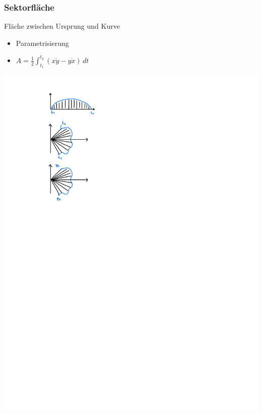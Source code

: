     \subsubsection{Sektorfläche}
        \flushleft Fläche zwischen Ursprung und Kurve
        \begin{minipage}{0.99\linewidth}
            \begin{minipage}{0.65\linewidth}
                \begin{itemize}
                    \item Parametrisierung
                    \item[]  $\displaystyle A= \frac{1}{2} \int_{t_1}^{t_2} (x \dot{y} - y \dot{x}) \, dt$   
                    \end{itemize}
            \end{minipage}
            \begin{minipage}{0.34\linewidth}
                    \includegraphics[width=0.6\linewidth]{src/11_Integralrechnung/sektor.pdf}
            \end{minipage}
        \end{minipage}
        
